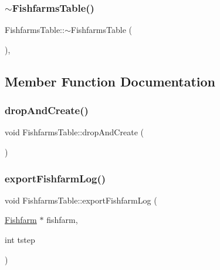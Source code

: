 \mbox{\label{class_fishfarms_table_a260c1d5c2aa4eb94d78ab686a54ac9c7}} 
\subsubsection{\texorpdfstring{$\sim$FishfarmsTable()}{~FishfarmsTable()}}
{\footnotesize\ttfamily Fishfarms\+Table\+::$\sim$\+Fishfarms\+Table (\begin{DoxyParamCaption}{ }\end{DoxyParamCaption})\hspace{0.3cm}{\ttfamily [default]}, {\ttfamily [noexcept]}}



\subsection{Member Function Documentation}
\mbox{\label{class_fishfarms_table_a88e7280ea0ff04a2b257c0977030d9d3}} 
\subsubsection{\texorpdfstring{dropAndCreate()}{dropAndCreate()}}
{\footnotesize\ttfamily void Fishfarms\+Table\+::drop\+And\+Create (\begin{DoxyParamCaption}{ }\end{DoxyParamCaption})}

\mbox{\label{class_fishfarms_table_abb6b0a8fa276e4ec032f80f54526da27}} 
\subsubsection{\texorpdfstring{exportFishfarmLog()}{exportFishfarmLog()}}
{\footnotesize\ttfamily void Fishfarms\+Table\+::export\+Fishfarm\+Log (\begin{DoxyParamCaption}\item[{\mbox{\hyperlink{class_fishfarm}{Fishfarm}} $\ast$}]{fishfarm,  }\item[{int}]{tstep }\end{DoxyParamCaption})}




